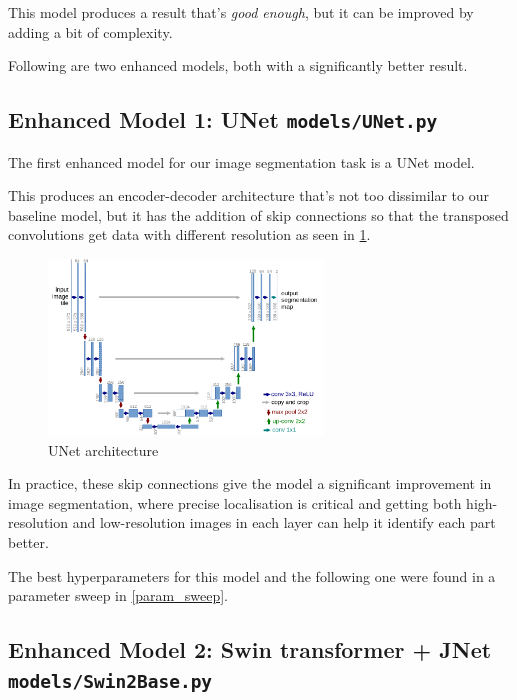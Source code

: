 This model produces a result that's \textit{good enough}, but it can be improved by adding a bit of complexity.

Following are two enhanced models, both with a significantly better result.

\subsection{Enhanced Model 1: UNet \phantom{MMMMMMMMMMMMx}\small\texttt{models/UNet.py}}

The first enhanced model for our image segmentation task is a UNet model\cite{unet}.

This produces an encoder-decoder architecture that's not too dissimilar to our baseline model, but it has the addition of skip connections so that the transposed convolutions get data with different resolution as seen in \cref{unet}.

\begin{figure}[h]
    \centering 
    \includegraphics[width=0.65\textwidth]{u-net-illustration-correct-scale2.pdf}
    \caption{UNet architecture}
    \label{unet}
\end{figure}

In practice, these skip connections give the model a significant improvement in image segmentation, where precise localisation is critical and getting both high-resolution and low-resolution images in each layer can help it identify each part better.

The best hyperparameters for this model and the following one were found in a parameter sweep in \cref{param_sweep}.

\subsection{Enhanced Model 2: Swin transformer + JNet \phantom{xx}\small\texttt{models/Swin2Base.py}}

